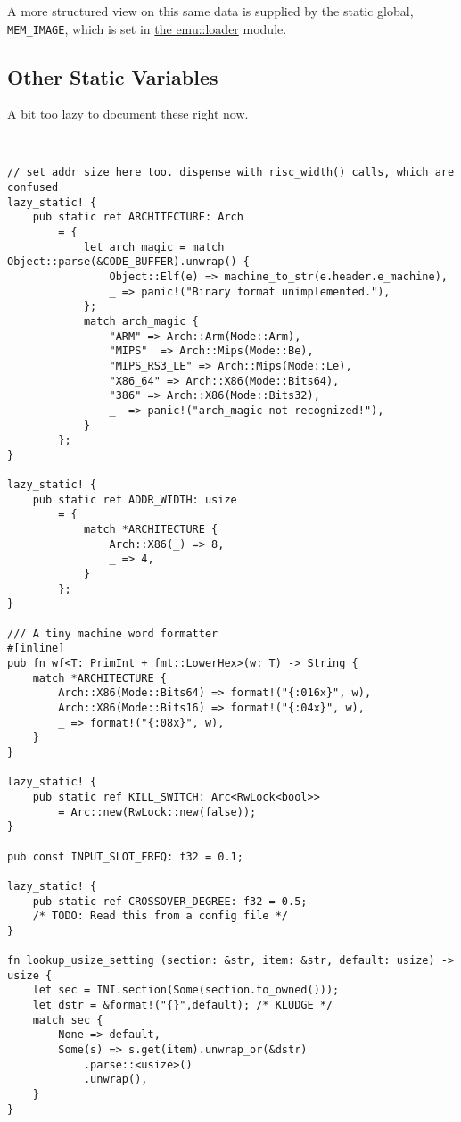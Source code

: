 \documentclass[11pt]{article}
\begin{document}
A more structured view on this same data is supplied by the static global,
\texttt{MEM\_IMAGE}, which is set in \href{../emu/loader.pdf}{the emu::loader} module.


\subsection{Other Static Variables}
\label{sec:org2386bf7}

A bit too lazy to document these right now. 
\lstset{language=rust,label=orge6e030e,caption= ,captionpos=b,numbers=none}
\begin{lstlisting}


// set addr size here too. dispense with risc_width() calls, which are confused
lazy_static! {
    pub static ref ARCHITECTURE: Arch
        = {
            let arch_magic = match Object::parse(&CODE_BUFFER).unwrap() {
                Object::Elf(e) => machine_to_str(e.header.e_machine),
                _ => panic!("Binary format unimplemented."),
            };
            match arch_magic {
                "ARM" => Arch::Arm(Mode::Arm),
                "MIPS"  => Arch::Mips(Mode::Be),
                "MIPS_RS3_LE" => Arch::Mips(Mode::Le),
                "X86_64" => Arch::X86(Mode::Bits64),
                "386" => Arch::X86(Mode::Bits32),
                _  => panic!("arch_magic not recognized!"),
            }
        };
}

lazy_static! {
    pub static ref ADDR_WIDTH: usize
        = {
            match *ARCHITECTURE {
                Arch::X86(_) => 8,
                _ => 4,
            }
        };
}

/// A tiny machine word formatter
#[inline]
pub fn wf<T: PrimInt + fmt::LowerHex>(w: T) -> String {
    match *ARCHITECTURE {
        Arch::X86(Mode::Bits64) => format!("{:016x}", w),
        Arch::X86(Mode::Bits16) => format!("{:04x}", w),
        _ => format!("{:08x}", w),
    }
}

lazy_static! {
    pub static ref KILL_SWITCH: Arc<RwLock<bool>>
        = Arc::new(RwLock::new(false));
}

pub const INPUT_SLOT_FREQ: f32 = 0.1;

lazy_static! {
    pub static ref CROSSOVER_DEGREE: f32 = 0.5;
    /* TODO: Read this from a config file */
}

fn lookup_usize_setting (section: &str, item: &str, default: usize) -> usize {
    let sec = INI.section(Some(section.to_owned()));
    let dstr = &format!("{}",default); /* KLUDGE */
    match sec {
        None => default,
        Some(s) => s.get(item).unwrap_or(&dstr)
            .parse::<usize>()
            .unwrap(),
    }
}


\end{lstlisting}
\end{document}
